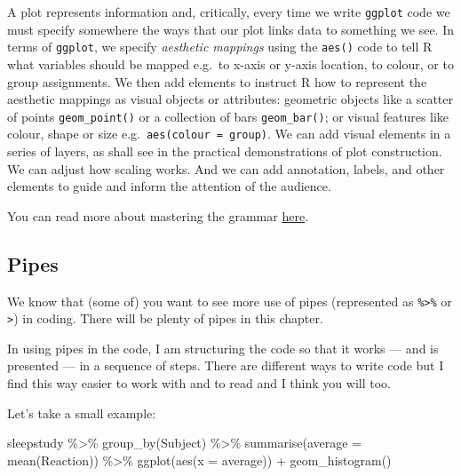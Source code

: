 \documentclass[
  letterpaper,
  DIV=11,
  numbers=noendperiod]{scrreprt}
\newenvironment{Shaded}{\begin{snugshade}}{\end{snugshade}}
\newcommand{\AttributeTok}[1]{\textcolor[rgb]{0.40,0.45,0.13}{#1}}
\newcommand{\FunctionTok}[1]{\textcolor[rgb]{0.28,0.35,0.67}{#1}}
\newcommand{\NormalTok}[1]{\textcolor[rgb]{0.00,0.23,0.31}{#1}}
\newcommand{\SpecialCharTok}[1]{\textcolor[rgb]{0.37,0.37,0.37}{#1}}
\begin{document}
A plot represents information and, critically, every time we write
\texttt{ggplot} code we must specify somewhere the ways that our plot
links data to something we see. In terms of \texttt{ggplot}, we specify
\emph{aesthetic mappings} using the \texttt{aes()} code to tell R what
variables should be mapped e.g.~to x-axis or y-axis location, to colour,
or to group assignments. We then add elements to instruct R how to
represent the aesthetic mappings as visual objects or attributes:
geometric objects like a scatter of points \texttt{geom\_point()} or a
collection of bars \texttt{geom\_bar()}; or visual features like colour,
shape or size e.g.~\texttt{aes(colour\ =\ group)}. We can add visual
elements in a series of layers, as shall see in the practical
demonstrations of plot construction. We can adjust how scaling works.
And we can add annotation, labels, and other elements to guide and
inform the attention of the audience.

You can read more about mastering the grammar
\href{https://ggplot2-book.org/mastery.html}{here}.

\hypertarget{pipes}{%
\subsection{Pipes}\label{pipes}}

We know that (some of) you want to see more use of pipes (represented as
\texttt{\%\textgreater{}\%} or \texttt{\textbar{}\textgreater{}}) in
coding. There will be plenty of pipes in this chapter.

In using pipes in the code, I am structuring the code so that it works
--- and is presented --- in a sequence of steps. There are different
ways to write code but I find this way easier to work with and to read
and I think you will too.

Let's take a small example:

\begin{Shaded}
\begin{Highlighting}[numbers=left,,]
\NormalTok{sleepstudy }\SpecialCharTok{\%\textgreater{}\%}
  \FunctionTok{group\_by}\NormalTok{(Subject) }\SpecialCharTok{\%\textgreater{}\%}
  \FunctionTok{summarise}\NormalTok{(}\AttributeTok{average =} \FunctionTok{mean}\NormalTok{(Reaction)) }\SpecialCharTok{\%\textgreater{}\%}
  \FunctionTok{ggplot}\NormalTok{(}\FunctionTok{aes}\NormalTok{(}\AttributeTok{x =}\NormalTok{ average)) }\SpecialCharTok{+} 
  \FunctionTok{geom\_histogram}\NormalTok{()}
\end{Highlighting}
\end{Shaded}
\end{document}
